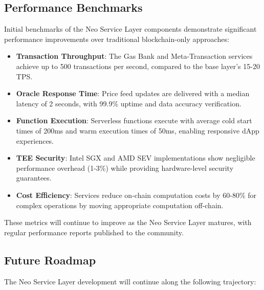 \documentclass[11pt]{article}
\begin{document}
\subsection{Performance Benchmarks}

Initial benchmarks of the Neo Service Layer components demonstrate significant performance improvements over traditional blockchain-only approaches:

\begin{itemize}
    \item \textbf{Transaction Throughput}: The Gas Bank and Meta-Transaction services achieve up to 500 transactions per second, compared to the base layer's 15-20 TPS.
    
    \item \textbf{Oracle Response Time}: Price feed updates are delivered with a median latency of 2 seconds, with 99.9\% uptime and data accuracy verification.
    
    \item \textbf{Function Execution}: Serverless functions execute with average cold start times of 200ms and warm execution times of 50ms, enabling responsive dApp experiences.
    
    \item \textbf{TEE Security}: Intel SGX and AMD SEV implementations show negligible performance overhead (1-3\%) while providing hardware-level security guarantees.
    
    \item \textbf{Cost Efficiency}: Services reduce on-chain computation costs by 60-80\% for complex operations by moving appropriate computation off-chain.
\end{itemize}

These metrics will continue to improve as the Neo Service Layer matures, with regular performance reports published to the community.

\subsection{Future Roadmap}

The Neo Service Layer development will continue along the following trajectory:
\end{document}

